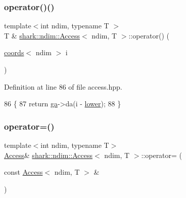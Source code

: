 \subsubsection{\texorpdfstring{operator()()}{operator()()}\hspace{0.1cm}{\footnotesize\ttfamily [2/2]}}
{\footnotesize\ttfamily template$<$int ndim, typename T $>$ \\
T \& \hyperlink{classshark_1_1ndim_1_1_access}{shark\+::ndim\+::\+Access}$<$ ndim, T $>$\+::operator() (\begin{DoxyParamCaption}\item[{\hyperlink{structshark_1_1ndim_1_1coords}{coords}$<$ ndim $>$}]{i }\end{DoxyParamCaption})\hspace{0.3cm}{\ttfamily [inline]}}



Definition at line 86 of file access.\+hpp.


\begin{DoxyCode}
86                                                            \{
87             \textcolor{keywordflow}{return} \hyperlink{classshark_1_1ndim_1_1_access_abc59e261a07fcecc3f1db641ef04efa7}{ga}->da(i - \hyperlink{classshark_1_1ndim_1_1_access_ac1e92dba307ff877963c94bd42fcbafb}{lower});
88         \}
\end{DoxyCode}
\hypertarget{classshark_1_1ndim_1_1_access_a8bda6b272af845c56891d06343b686f2}{}\label{classshark_1_1ndim_1_1_access_a8bda6b272af845c56891d06343b686f2} 
\subsubsection{\texorpdfstring{operator=()}{operator=()}\hspace{0.1cm}{\footnotesize\ttfamily [1/2]}}
{\footnotesize\ttfamily template$<$int ndim, typename T$>$ \\
\hyperlink{classshark_1_1ndim_1_1_access}{Access}\& \hyperlink{classshark_1_1ndim_1_1_access}{shark\+::ndim\+::\+Access}$<$ ndim, T $>$\+::operator= (\begin{DoxyParamCaption}\item[{const \hyperlink{classshark_1_1ndim_1_1_access}{Access}$<$ ndim, T $>$ \&}]{ }\end{DoxyParamCaption})\hspace{0.3cm}{\ttfamily [delete]}}


